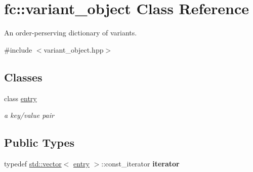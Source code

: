 \hypertarget{classfc_1_1variant__object}{}\section{fc\+:\+:variant\+\_\+object Class Reference}
\label{classfc_1_1variant__object}


An order-\/perserving dictionary of variant\textquotesingle{}s.  




{\ttfamily \#include $<$variant\+\_\+object.\+hpp$>$}

\subsection*{Classes}
\begin{DoxyCompactItemize}
\item 
class \mbox{\hyperlink{classfc_1_1variant__object_1_1entry}{entry}}
\begin{DoxyCompactList}\small\item\em a key/value pair \end{DoxyCompactList}\end{DoxyCompactItemize}
\subsection*{Public Types}
\begin{DoxyCompactItemize}
\item 
\mbox{\label{classfc_1_1variant__object_aa916b09eef2dc02ea4a1400a1e69d2ae}} 
typedef \mbox{\hyperlink{classstd_1_1vector}{std\+::vector}}$<$ \mbox{\hyperlink{classfc_1_1variant__object_1_1entry}{entry}} $>$\+::const\+\_\+iterator {\bfseries iterator}
\end{DoxyCompactItemize}

